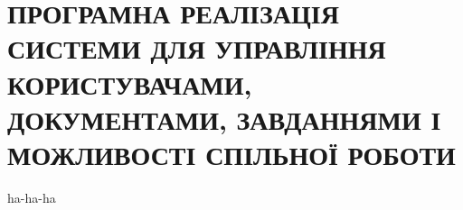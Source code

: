 \section{ПРОГРАМНА РЕАЛІЗАЦІЯ СИСТЕМИ ДЛЯ УПРАВЛІННЯ КОРИСТУВАЧАМИ, ДОКУМЕНТАМИ, ЗАВДАННЯМИ І МОЖЛИВОСТІ СПІЛЬНОЇ РОБОТИ}
ha-ha-ha